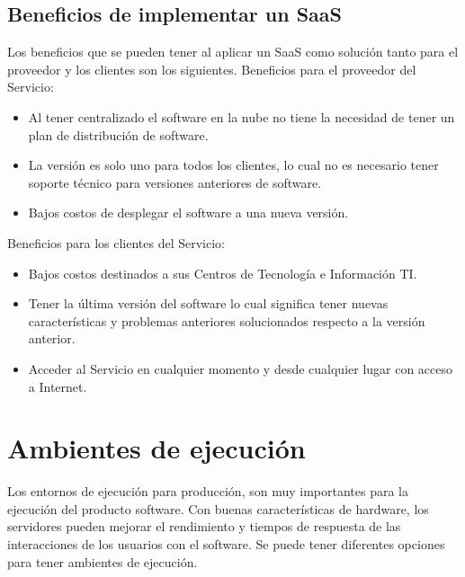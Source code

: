 \subsection{Beneficios de implementar un SaaS}
\noindent Los beneficios que se pueden tener al aplicar un SaaS como solución tanto para el proveedor y los clientes son los siguientes.
\noindent Beneficios para el proveedor del Servicio:
\begin{itemize}
\item Al tener centralizado el software en la nube no tiene la necesidad de tener un plan de distribución de software.
\item La versión es solo uno para todos los clientes, lo cual no es necesario tener soporte técnico para versiones anteriores de software.
\item Bajos costos de desplegar el software a una nueva versión.
\end{itemize}

\noindent Beneficios para los clientes del Servicio:
\begin{itemize}
\item Bajos costos destinados a sus Centros de Tecnología e Información TI.
\item Tener la última versión del software lo cual significa tener nuevas características y problemas anteriores solucionados respecto a la versión anterior.
\item Acceder al Servicio en cualquier momento y desde cualquier lugar con acceso a Internet.
\end{itemize}

\section{Ambientes de ejecución}
\noindent Los entornos de ejecución para producción, son muy importantes para la ejecución del producto software. Con buenas características de hardware, los servidores pueden mejorar el rendimiento y tiempos de respuesta de las interacciones de los usuarios con el software. Se puede tener diferentes opciones para tener ambientes de ejecución.

